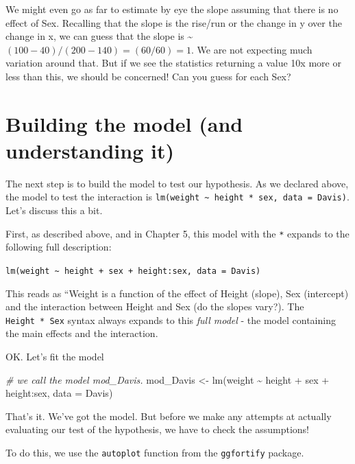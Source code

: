\documentclass[
]{book}
\newenvironment{Shaded}{\begin{snugshade}}{\end{snugshade}}
\newcommand{\AttributeTok}[1]{\textcolor[rgb]{0.77,0.63,0.00}{#1}}
\newcommand{\CommentTok}[1]{\textcolor[rgb]{0.56,0.35,0.01}{\textit{#1}}}
\newcommand{\FunctionTok}[1]{\textcolor[rgb]{0.00,0.00,0.00}{#1}}
\newcommand{\NormalTok}[1]{#1}
\newcommand{\OtherTok}[1]{\textcolor[rgb]{0.56,0.35,0.01}{#1}}
\newcommand{\SpecialCharTok}[1]{\textcolor[rgb]{0.00,0.00,0.00}{#1}}
\begin{document}
We might even go as far to estimate by eye the slope assuming that there is no effect of Sex. Recalling that the slope is the rise/run or the change in y over the change in x, we can guess that the slope is \textasciitilde{} \((100-40)/(200-140) = (60/60) = 1\). We are not expecting much variation around that. But if we see the statistics returning a value 10x more or less than this, we should be concerned! Can you guess for each Sex?

\hypertarget{building-the-model-and-understanding-it}{%
\section{Building the model (and understanding it)}\label{building-the-model-and-understanding-it}}

The next step is to build the model to test our hypothesis. As we declared above, the model to test the interaction is \texttt{lm(weight\ \textasciitilde{}\ height\ *\ sex,\ data\ =\ Davis)}. Let's discuss this a bit.

First, as described above, and in Chapter 5, this model with the \texttt{*} expands to the following full description:

\texttt{lm(weight\ \textasciitilde{}\ height\ +\ sex\ +\ height:sex,\ data\ =\ Davis)}

This reads as ``Weight is a function of the effect of Height (slope), Sex (intercept) and the interaction between Height and Sex (do the slopes vary?). The \texttt{Height\ *\ Sex} syntax always expands to this \emph{full model} - the model containing the main effects and the interaction.

OK. Let's fit the model

\begin{Shaded}
\begin{Highlighting}[]
\CommentTok{\# we call the model mod\_Davis.}
\NormalTok{mod\_Davis }\OtherTok{\textless{}{-}} \FunctionTok{lm}\NormalTok{(weight }\SpecialCharTok{\textasciitilde{}}\NormalTok{ height }\SpecialCharTok{+}\NormalTok{ sex }\SpecialCharTok{+}\NormalTok{ height}\SpecialCharTok{:}\NormalTok{sex, }\AttributeTok{data =}\NormalTok{ Davis)}
\end{Highlighting}
\end{Shaded}

That's it. We've got the model. But before we make any attempts at actually evaluating our test of the hypothesis, we have to check the assumptions!

To do this, we use the \texttt{autoplot} function from the \texttt{ggfortify} package.
\end{document}
